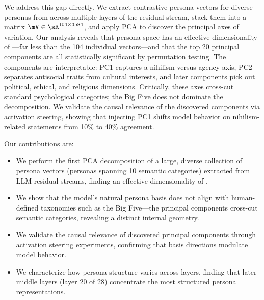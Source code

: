 We address this gap directly. We extract contrastive persona vectors for \npersonas diverse personas from \qwen across multiple layers of the residual stream, stack them into a matrix $\mV \in \sR^{104 \times 3584}$, and apply PCA to discover the principal axes of variation. Our analysis reveals that persona space has an effective dimensionality of \effdim---far less than the 104 individual vectors---and that the top 20 principal components are all statistically significant by permutation testing. The components are interpretable: PC1 captures a nihilism-versus-agency axis, PC2 separates antisocial traits from cultural interests, and later components pick out political, ethical, and religious dimensions. Critically, these axes cross-cut standard psychological categories; the Big Five does not dominate the decomposition. We validate the causal relevance of the discovered components via activation steering, showing that injecting PC1 shifts model behavior on nihilism-related statements from 10\% to 40\% agreement.

Our contributions are:
\begin{itemize}[leftmargin=*,itemsep=0pt,topsep=0pt]
    \item We perform the first PCA decomposition of a large, diverse collection of persona vectors (\npersonas personas spanning 10 semantic categories) extracted from LLM residual streams, finding an effective dimensionality of \effdim.
    \item We show that the model's natural persona basis does not align with human-defined taxonomies such as the Big Five---the principal components cross-cut semantic categories, revealing a distinct internal geometry.
    \item We validate the causal relevance of discovered principal components through activation steering experiments, confirming that basis directions modulate model behavior.
    \item We characterize how persona structure varies across layers, finding that later-middle layers (layer 20 of 28) concentrate the most structured persona representations.
\end{itemize}
